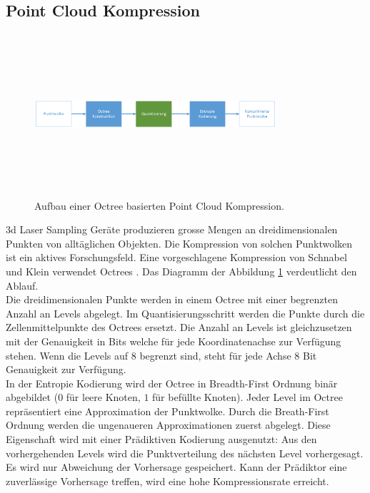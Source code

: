 \subsection{Point Cloud Kompression} \label{state:pointcloud}
\begin{figure}[!htbp]
	\center
	\includegraphics[width=0.8\textwidth,height=6cm,keepaspectratio]{./pictures/state/pointcloud.png}
	\caption{Aufbau einer Octree basierten Point Cloud Kompression.}
	\label{state:pointcloud:abb}
\end{figure}
3d Laser Sampling Geräte produzieren grosse Mengen an dreidimensionalen Punkten von alltäglichen Objekten. Die Kompression von solchen Punktwolken ist ein aktives Forschungsfeld. Eine vorgeschlagene Kompression  von Schnabel und Klein \cite{schnabel2006octree} verwendet Octrees \cite{wiki:octree}. Das Diagramm der Abbildung \ref{state:pointcloud:abb} verdeutlicht den Ablauf.\\
Die dreidimensionalen Punkte werden in einem Octree mit einer begrenzten Anzahl an Levels abgelegt. Im Quantisierungsschritt werden die Punkte durch die Zellenmittelpunkte des Octrees ersetzt. Die Anzahl an Levels ist gleichzusetzen mit der Genauigkeit in Bits welche für jede Koordinatenachse zur Verfügung stehen. Wenn die Levels auf $8$ begrenzt sind, steht für jede Achse $8$ Bit Genauigkeit zur Verfügung.\\
In der Entropie Kodierung wird der Octree in Breadth-First Ordnung binär abgebildet ($0$ für leere Knoten, $1$ für befüllte Knoten). Jeder Level im Octree repräsentiert eine Approximation der Punktwolke. Durch  die Breath-First Ordnung werden die ungenaueren Approximationen zuerst abgelegt. Diese Eigenschaft wird mit einer Prädiktiven Kodierung ausgenutzt: Aus den vorhergehenden Levels wird die Punktverteilung des nächsten Level vorhergesagt. Es wird nur Abweichung der Vorhersage gespeichert. Kann der Prädiktor eine zuverlässige Vorhersage treffen, wird eine hohe Kompressionsrate erreicht.

